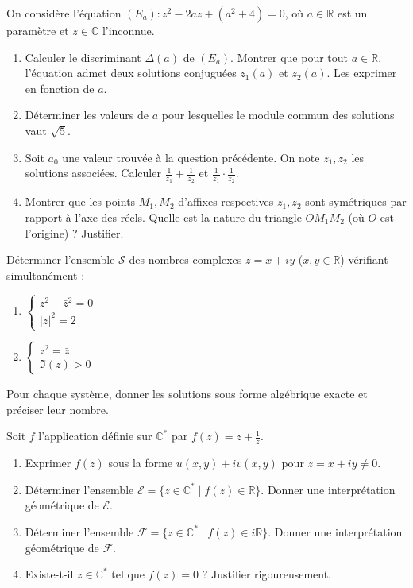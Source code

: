 \documentclass[11pt]{article}
\begin{document}
\begin{exercice}
On considère l'équation $(E_a) : z^2 - 2az + (a^2 + 4) = 0$, où $a \in \mathbb{R}$ est un paramètre et $z \in \mathbb{C}$ l'inconnue.
\begin{enumerate}
    \item Calculer le discriminant $\Delta(a)$ de $(E_a)$. Montrer que pour tout $a \in \mathbb{R}$, l'équation admet deux solutions conjuguées $z_1(a)$ et $z_2(a)$. Les exprimer en fonction de $a$.
    \item Déterminer les valeurs de $a$ pour lesquelles le module commun des solutions vaut $\sqrt{5}$.
    \item Soit $a_0$ une valeur trouvée à la question précédente. On note $z_1, z_2$ les solutions associées. Calculer $\frac{1}{z_1} + \frac{1}{z_2}$ et $\frac{1}{z_1} \cdot \frac{1}{z_2}$.
    \item Montrer que les points $M_1, M_2$ d'affixes respectives $z_1, z_2$ sont symétriques par rapport à l'axe des réels. Quelle est la nature du triangle $OM_1M_2$ (où $O$ est l'origine) ? Justifier.
\end{enumerate}
\end{exercice}

\begin{exercice}
Déterminer l'ensemble $\mathcal{S}$ des nombres complexes $z = x+iy$ ($x,y \in \mathbb{R}$) vérifiant simultanément :
\begin{enumerate}
    \item $\begin{cases} z^2 + \bar{z}^2 = 0 \\ |z|^2 = 2 \end{cases}$
    \item $\begin{cases} z^2 = \bar{z} \\ \Im(z) > 0 \end{cases}$
\end{enumerate}
Pour chaque système, donner les solutions sous forme algébrique exacte et préciser leur nombre.
\end{exercice}

\begin{exercice}
Soit $f$ l'application définie sur $\mathbb{C}^*$ par $f(z) = z + \frac{1}{\bar{z}}$.
\begin{enumerate}
    \item Exprimer $f(z)$ sous la forme $u(x,y) + i v(x,y)$ pour $z = x+iy \neq 0$.
    \item Déterminer l'ensemble $\mathcal{E} = \{ z \in \mathbb{C}^* \mid f(z) \in \mathbb{R} \}$. Donner une interprétation géométrique de $\mathcal{E}$.
    \item Déterminer l'ensemble $\mathcal{F} = \{ z \in \mathbb{C}^* \mid f(z) \in i\mathbb{R} \}$. Donner une interprétation géométrique de $\mathcal{F}$.
    \item Existe-t-il $z \in \mathbb{C}^*$ tel que $f(z) = 0$ ? Justifier rigoureusement.
\end{enumerate}
\end{exercice}
\end{document}
